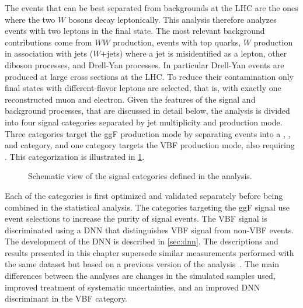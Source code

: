 The \HWW events that can be best separated from backgrounds at the LHC are the ones where the two $W$ bosons decay leptonically.
This analysis therefore analyzes events with two leptons in the final state. 
The most relevant background contributions come from $WW$ production, events with top quarks, $W$ production in association with jets ($W$+jets) where a jet is misidentified as a lepton, other diboson processes, and Drell-Yan processes. In particular Drell-Yan events are produced at large cross sections at the LHC. To reduce their contamination only final states with different-flavor leptons are selected, that is, with exactly one reconstructed muon and electron.
Given the features of the signal and background processes, that are discussed in detail below, the analysis is divided into four signal categories separated by jet multiplicity and production mode.
Three categories target the ggF production mode by separating events into a \ZeroJet, \OneJet, and \TwoJet category, and one category targets the VBF production mode, also requiring \TwoJet. 
This categorization is illustrated in \cref{fig:signal-categorization}. 
\begin{figure}
    \caption{Schematic view of the signal categories defined in the \HWW analysis.}
    \label{fig:signal-categorization}
\end{figure}
Each of the categories is first optimized and validated separately before being combined in the statistical analysis.
The categories targeting the ggF signal use event selections to increase the purity of signal events. 
The VBF signal is discriminated using a DNN that distinguishes VBF signal from non-VBF events. 
The development of the DNN is described in \cref{sec:dnn}. 
The descriptions and results presented in this chapter supersede similar measurements performed with the same dataset but based on a previous version of the analysis~\cite{ATLAS-CONF-2021-014}.
The main differences between the analyses are changes in the simulated samples used, improved treatment of systematic uncertainties, and an improved DNN discriminant in the VBF category. 

